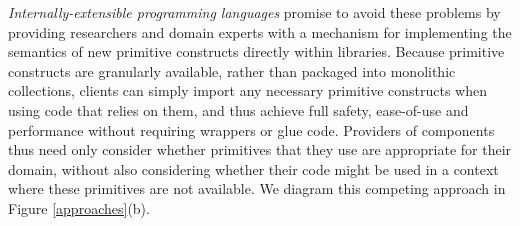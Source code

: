 \documentclass{llncs}
\begin{document}
%
%



\emph{Internally-extensible programming languages} promise to avoid these problems by providing researchers and domain experts with a mechanism for implementing the semantics of new primitive constructs directly within libraries.
Because primitive constructs are granularly available, rather than packaged into monolithic collections, clients can simply import any necessary primitive constructs when using code that relies on them, and thus achieve full safety, ease-of-use and performance without requiring wrappers or glue code. Providers of components thus need only consider whether primitives that they use are appropriate for their domain, without also considering whether their code might be used in a context where these primitives are not available. We diagram this competing approach in Figure \ref{approaches}(b).

\end{document}
